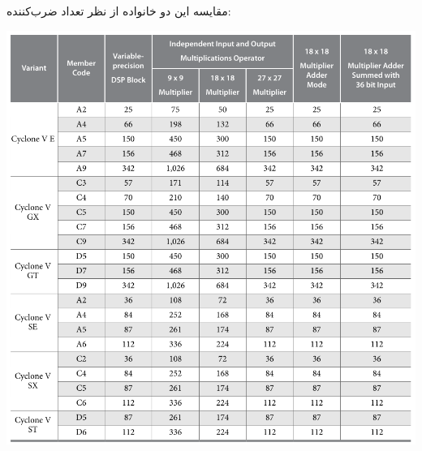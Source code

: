 \begin{qsolve}
	مقایسه این دو خانواده از نظر تعداد ضرب‌کننده:
	\begin{center}
		\includegraphics*[width=0.8\linewidth]{pics/img8.png}
		\label{ضرب‌کننده‌های Cyclone}
	\end{center}
\end{qsolve}


